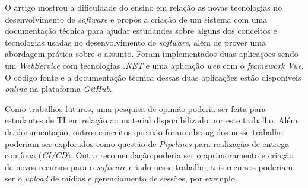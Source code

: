\documentclass[12pt]{article}
\begin{document}
O artigo mostrou a dificuldade do ensino em relação as novas tecnologias no desenvolvimento de \textit{software}
e propôs a criação de um sistema com uma documentação técnica para ajudar estudandes sobre alguns dos
conceitos e tecnologias usadas no desenvolvimento de \textit{software}, além de prover uma abordagem prática
sobre o assunto. Foram implementados duas aplicações sendo um \textit{WebService} com tecnologias \textit{.NET} e
uma aplicação \textit{web} com o \textit{framework Vue}. O código fonte e a documentação técnica dessas duas aplicações
estão disponíveis \textit{online} na plataforma \textit{GitHub}.

Como trabalhos futuros, uma pesquisa de opinião poderia ser feita para estudantes de TI em relação ao material
disponibilizado por este trabalho. Além da documentação, outros conceitos que não foram abrangidos nesse trabalho poderiam
ser explorados como questão de \textit{Pipelines} para realização de entrega contínua (\textit{CI/CD}).
Outra recomendação poderia ser o aprimoramento e criação de novos recursos para o \textit{software} criado nesse trabalho, tais recursos
poderiam ser o \textit{upload} de mídias e gerenciamento de sessões, por exemplo.



\end{document}
